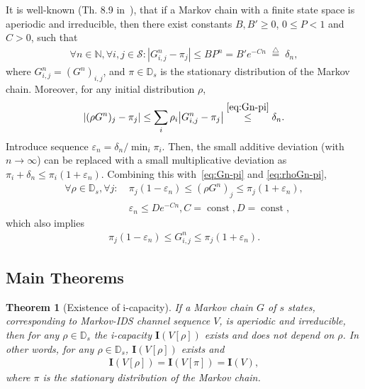 \documentclass[journal, twocol]{IEEEtran}
\newcommand{\bD}{{\mathbb{D}}}
\newcommand{\bfI}{{\mathbf{I}}}
\newcommand{\bN}{{\mathbb{N}}}
\newcommand{\mS}{{\mathcal{S}}}
\newcommand{\brabs}[1]{{\left|{#1}\right|}}
\newcommand{\defeq}{{\overset{\triangle}{=}}}
\newcommand{\ve}{\varepsilon}
\newtheorem{theorem}{Theorem}
\DeclareMathOperator{\const}{const}
\begin{document}
It is well-known (Th. 8.9 in~\cite{billingsley12probability}), that if a Markov chain with a finite state space is aperiodic and irreducible, then there exist constants $B,B'\geq 0$, $0\leq P<1$ and $C>0$, such that
\begin{align}
\forall n\in\bN,\forall i,j\in\mS: |G^n_{i, j}-\pi_j|\leq BP^n=B'e^{-Cn}\;\defeq\;\delta_n,
\label{eq:Gn-pi}
\end{align}
where $G^n_{i,j}=(G^n)_{i,j}$, and $\pi\!\in\!\bD_s$ is the stationary distribution of the Markov chain.
Moreover, for any initial distribution $\rho$,
\begin{align}
\brabs{(\rho G^n)_j-\pi_j}
\leq \sum_i\rho_i\brabs{G^n_{i,j}-\pi_j}
\stackrel{\eqref{eq:Gn-pi}}{\leq} \delta_n.
\label{eq:rhoGn-pi}
\end{align}
Introduce sequence $\ve_n=\delta_n/\min_i \pi_i$.
Then, the small additive deviation (with $n\to\infty$) can be replaced with a small multiplicative deviation as $\pi_i+\delta_n\leq \pi_i(1+\ve_n)$. 
Combining this with~\eqref{eq:Gn-pi} and \eqref{eq:rhoGn-pi},
\begin{align}
\forall \rho\in\bD_s, \forall j:~&\pi_j(1-\ve_n)\leq (\rho G^n)_j \leq \pi_j(1+\ve_n),
\label{eq:rhogn-as}\\
&\ve_n\leq De^{-Cn}, C=\const,D=\const,
\label{eq:ve-as}
\end{align}
which also implies 
\begin{align}
\pi_j(1-\ve_n)\leq G^n_{i, j} \leq \pi_j(1+\ve_n).
\label{eq:gijdounded}
\end{align}
\subsection{Main Theorems}

\begin{theorem}[Existence of i-capacity]
\label{theorem1}
If a Markov chain $G$ of $s$ states, corresponding to Markov-IDS channel sequence $V$, is aperiodic and irreducible, then for any $\rho\in\bD_s$ the i-capacity $\bfI(V[\rho])$ exists and does not depend on $\rho$.
In other words, for any $\rho \in \bD_s$, $\bfI(V[\rho])$ exists and
\begin{align}
\bfI(V[\rho])=\bfI(V[\pi])=\bfI(V),
\label{eq:t1}
\end{align}
where $\pi$ is the stationary distribution of the Markov chain.
\end{theorem}
\end{document}
